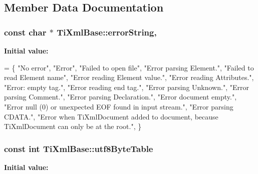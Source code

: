 \subsection{Member Data Documentation}
\hypertarget{classTiXmlBase_a7ac8feec4100e446b3d78e1ac0659700}{
\subsubsection[{error\-String}]{\setlength{\rightskip}{0pt plus 5cm}const char $\ast$ Ti\-Xml\-Base\-::error\-String\hspace{0.3cm}{\ttfamily [static]}, {\ttfamily [protected]}}}\label{classTiXmlBase_a7ac8feec4100e446b3d78e1ac0659700}
{\bfseries Initial value\-:}
\begin{DoxyCode}
=
\{
    \textcolor{stringliteral}{"No error"},
    \textcolor{stringliteral}{"Error"},
    \textcolor{stringliteral}{"Failed to open file"},
    \textcolor{stringliteral}{"Error parsing Element."},
    \textcolor{stringliteral}{"Failed to read Element name"},
    \textcolor{stringliteral}{"Error reading Element value."},
    \textcolor{stringliteral}{"Error reading Attributes."},
    \textcolor{stringliteral}{"Error: empty tag."},
    \textcolor{stringliteral}{"Error reading end tag."},
    \textcolor{stringliteral}{"Error parsing Unknown."},
    \textcolor{stringliteral}{"Error parsing Comment."},
    \textcolor{stringliteral}{"Error parsing Declaration."},
    \textcolor{stringliteral}{"Error document empty."},
    \textcolor{stringliteral}{"Error null (0) or unexpected EOF found in input stream."},
    \textcolor{stringliteral}{"Error parsing CDATA."},
    \textcolor{stringliteral}{"Error when TiXmlDocument added to document, because TiXmlDocument can only be at the root."},
\}
\end{DoxyCode}
\hypertarget{classTiXmlBase_ac8c86058137bdb4b413c3eca58f2d467}{
\subsubsection[{utf8\-Byte\-Table}]{\setlength{\rightskip}{0pt plus 5cm}const int Ti\-Xml\-Base\-::utf8\-Byte\-Table\hspace{0.3cm}{\ttfamily [static]}}}\label{classTiXmlBase_ac8c86058137bdb4b413c3eca58f2d467}
{\bfseries Initial value\-:}
